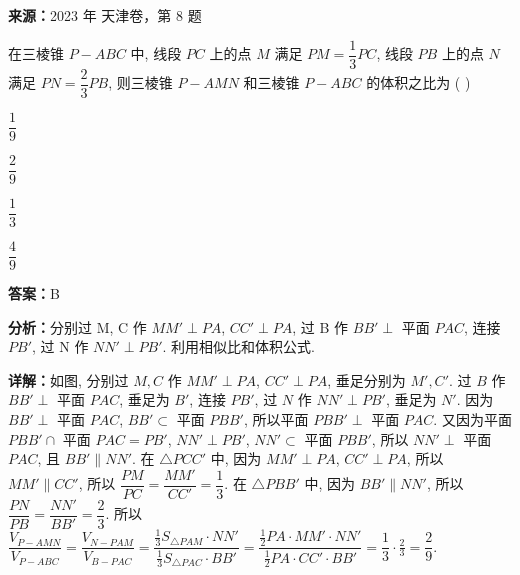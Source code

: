 \begin{question}[points=5]
\textbf{来源：}2023 年 天津卷，第 8 题\par
在三棱锥 $P-ABC$ 中, 线段 $PC$ 上的点 $M$ 满足 $PM = \dfrac{1}{3}PC$, 线段 $PB$ 上的点 $N$ 满足 $PN = \dfrac{2}{3}PB$, 则三棱锥 $P-AMN$ 和三棱锥 $P-ABC$ 的体积之比为 ( )
\begin{choices}
  \item $\dfrac{1}{9}$
  \item $\dfrac{2}{9}$
  \item $\dfrac{1}{3}$
  \item $\dfrac{4}{9}$
\end{choices}
\begin{solution}
\textbf{答案：}B

\textbf{分析：}分别过 M, C 作 $MM' \perp PA$, $CC' \perp PA$, 过 B 作 $BB' \perp$ 平面 $PAC$, 连接 $PB'$, 过 N 作 $NN' \perp PB'$. 利用相似比和体积公式.

\textbf{详解：}如图, 分别过 $M, C$ 作 $MM' \perp PA$, $CC' \perp PA$, 垂足分别为 $M', C'$. 过 $B$ 作 $BB' \perp$ 平面 $PAC$, 垂足为 $B'$, 连接 $PB'$, 过 $N$ 作 $NN' \perp PB'$, 垂足为 $N'$. 因为 $BB' \perp$ 平面 $PAC$, $BB' \subset$ 平面 $PBB'$, 所以平面 $PBB' \perp$ 平面 $PAC$. 又因为平面 $PBB' \cap$ 平面 $PAC = PB'$, $NN' \perp PB'$, $NN' \subset$ 平面 $PBB'$, 所以 $NN' \perp$ 平面 $PAC$, 且 $BB' \parallel NN'$. 在 $\triangle PCC'$ 中, 因为 $MM' \perp PA$, $CC' \perp PA$, 所以 $MM' \parallel CC'$, 所以 $\dfrac{PM}{PC} = \dfrac{MM'}{CC'} = \dfrac{1}{3}$. 在 $\triangle PBB'$ 中, 因为 $BB' \parallel NN'$, 所以 $\dfrac{PN}{PB} = \dfrac{NN'}{BB'} = \dfrac{2}{3}$. 所以 $\dfrac{V_{P-AMN}}{V_{P-ABC}} = \dfrac{V_{N-PAM}}{V_{B-PAC}} = \dfrac{\frac{1}{3} S_{\triangle PAM} \cdot NN'}{\frac{1}{3} S_{\triangle PAC} \cdot BB'} = \dfrac{\frac{1}{2} PA \cdot MM' \cdot NN'}{\frac{1}{2} PA \cdot CC' \cdot BB'} = \dfrac{1}{3} \cdot \frac{2}{3} = \dfrac{2}{9}$.
\end{solution}
\end{question}


